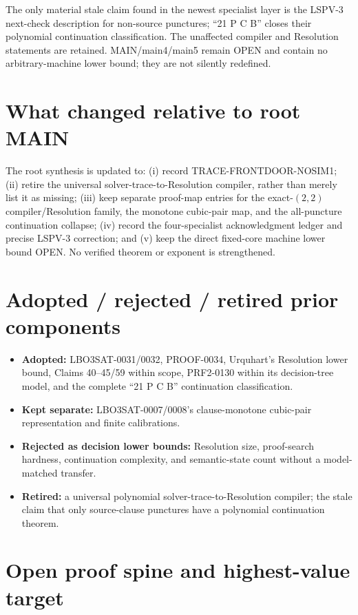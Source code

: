 \documentclass[11pt]{article}
\begin{document}
The only material stale claim found in the newest specialist layer is the
LSPV-3 next-check description for non-source punctures; ``21 P C B'' closes
their polynomial continuation classification.  The unaffected compiler and
Resolution statements are retained.  MAIN/main4/main5 remain OPEN and contain
no arbitrary-machine lower bound; they are not silently redefined.

\section{What changed relative to root MAIN}

The root synthesis is updated to: (i) record TRACE-FRONTDOOR-NOSIM1;
(ii) retire the universal solver-trace-to-Resolution compiler, rather than
merely list it as missing; (iii) keep separate proof-map entries for the
exact-$(2,2)$ compiler/Resolution family, the monotone cubic-pair map, and the
all-puncture continuation collapse; (iv) record the four-specialist
acknowledgment ledger and precise LSPV-3 correction; and (v) keep the direct
fixed-core machine lower bound OPEN.  No verified theorem or exponent is
strengthened.

\section{Adopted / rejected / retired prior components}

\begin{itemize}
\item \textbf{Adopted:} LBO3SAT-0031/0032, PROOF-0034, Urquhart's Resolution
lower bound, Claims 40--45/59 within scope, PRF2-0130 within its decision-tree
model, and the complete ``21 P C B'' continuation classification.
\item \textbf{Kept separate:} LBO3SAT-0007/0008's clause-monotone cubic-pair
representation and finite calibrations.
\item \textbf{Rejected as decision lower bounds:} Resolution size, proof-search
hardness, continuation complexity, and semantic-state count without a
model-matched transfer.
\item \textbf{Retired:} a universal polynomial solver-trace-to-Resolution
compiler; the stale claim that only source-clause punctures have a polynomial
continuation theorem.
\end{itemize}

\section{Open proof spine and highest-value target}
\end{document}
